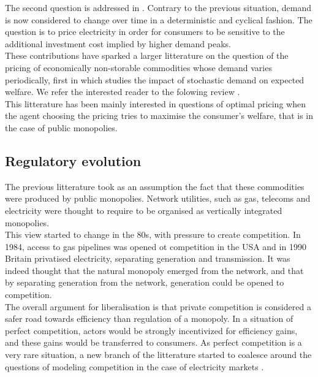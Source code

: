 The second question is addressed in \cite{boiteux1960peak}. Contrary to the previous situation, demand is now considered to change over time in a deterministic and cyclical fashion. The question is to price electricity in order for consumers to be sensitive to the additional investment cost implied by higher demand peaks. \\

These contributions have sparked a larger litterature on the question of the pricing of economically non-storable commodities whose demand varies periodically, first in \cite{brown1969public} which studies the impact of stochastic demand on expected welfare. We refer the interested reader to the folowing review \cite{crew1995theory}. \\ 

This litterature has been mainly interested in questions of optimal pricing when the agent choosing the pricing tries to maximise the consumer's welfare, that is in the case of public monopolies. \\

\subsection{Regulatory evolution}
The previous litterature took as an assumption the fact that these commodities were produced by public monopolies. Network utilities, such as gas, telecoms and electricity were thought to require to be organised as vertically integrated monopolies. \\

This view started to change in the 80s, with pressure to create competition. In 1984, access to gas pipelines was opened ot competition in the USA and in 1990 Britain privatised electricity, separating generation and transmission. It was indeed thought that the natural monopoly emerged from the network, and that by separating generation from the network, generation could be opened to competition. \\

The overall argument for liberalisation is that private competition is considered a safer road towards efficiency than regulation of a monopoly. In a situation of perfect competition, actors would be strongly incentivized for efficiency gains, and these gains would be transferred to consumers. As perfect competition is a very rare situation, a new branch of the litterature started to coalesce around the questions of modeling competition in the case of electricity markets \cite{newbery1997privatisation}. \\

